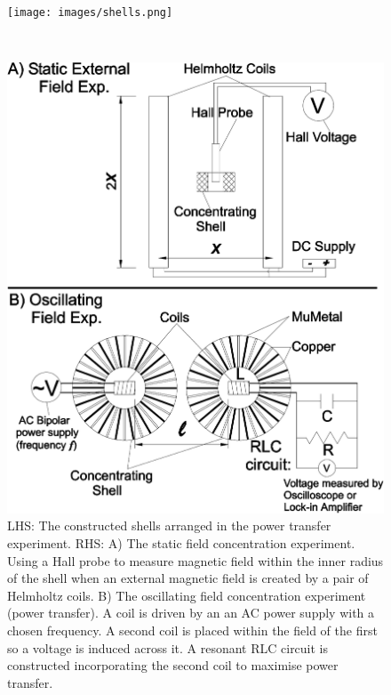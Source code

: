 \documentclass[11pt]{iopart}
\begin{document}
\begin{figure}
\begin{center}
    \begin{minipage}{0.395\textwidth}
        \noindent\texttt{[image: images/shells.png]}
    \end{minipage}
    ~~~
    \begin{minipage}{0.423\textwidth}
        \noindent\includegraphics[width=\linewidth]{images/all_schem.pdf}
    \end{minipage}
\caption{LHS: The constructed shells arranged in the power transfer
  experiment. RHS: A) The static field concentration experiment. Using
  a Hall probe to measure magnetic field within the inner radius of
  the shell when an external magnetic field is created by a pair of
  Helmholtz coils. B) The oscillating field concentration experiment
  (power transfer). A coil is driven by an an AC power supply with a
  chosen frequency. A second coil is placed within the field of the
  first so a voltage is induced across it. A resonant RLC circuit is
  constructed incorporating the second coil to maximise power
  transfer.}
\label{fig:shells}
\end{center}
\end{figure}
\end{document}
